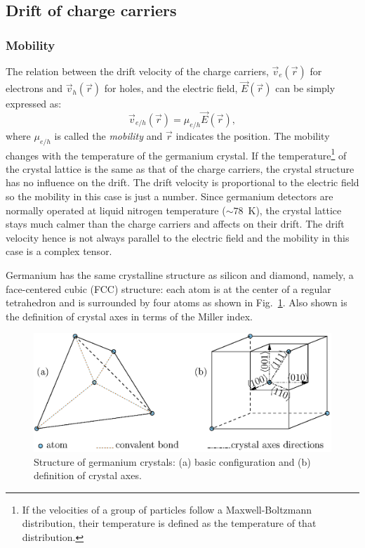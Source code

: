 \documentclass[epj]{svjour}
\begin{document}
\subsection{Drift of charge carriers} 
\label{sec:pss:mobi} 
\subsubsection{Mobility} 
\label{sec:pss:mobi} 
The relation between the drift velocity of the charge carriers,
$\vec{v}_{e}(\vec{r})$ for electrons and $\vec{v}_{h}(\vec{r})$ for
holes, and the electric field, $\vec{E}(\vec{r})$ can be simply
expressed as:
\begin{equation} 
\label{eq:det:dv}
\vec{v}_{e/h} (\vec{r})= \mu_{e/h} \vec{E}(\vec{r}),
\end{equation}
where $\mu_{e/h}$ is called the \emph{mobility} and $\vec{r}$
indicates the position. The mobility changes with the temperature of
the germanium crystal. If the temperature\footnote{If the velocities
of a group of particles follow a Maxwell-Boltzmann distribution, their
temperature is defined as the temperature of that distribution.} of
the crystal lattice is the same as that of the charge carriers, the
crystal structure has no influence on the drift. The drift velocity is
proportional to the electric field so the mobility in this case is
just a number. Since germanium detectors are normally operated at
liquid nitrogen temperature ($\sim78$~K), the crystal lattice stays
much calmer than the charge carriers and affects on their drift. The
drift velocity hence is not always parallel to the electric field and
the mobility in this case is a complex tensor.

Germanium has the same crystalline structure as silicon and diamond,
namely, a face-centered cubic (FCC) structure: each atom is at the
center of a regular tetrahedron and is surrounded by four atoms as
shown in Fig.~\ref{f:xtal}. Also shown is the definition of crystal
axes in terms of the Miller index.
\begin{figure}[htpb]
\centering
\includegraphics[width=\linewidth]{xtalStruc}   
\caption{Structure of germanium crystals: (a) basic configuration and
(b) definition of crystal axes.}
\label{f:xtal} 
\end{figure} 
 
\end{document}
